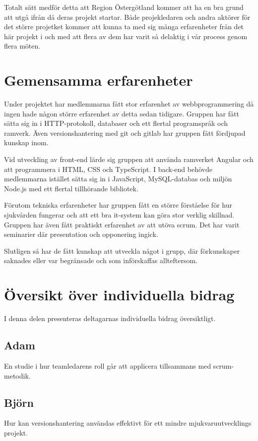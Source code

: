 Totalt sätt medför detta att Region Östergötland kommer att ha en bra grund att utgå ifrån då deras projekt startar. Både projekledaren och andra aktörer för det större projetket kommer att kunna ta med sig många erfarenheter från det här projekt i och med att flera av dem har varit så delaktig i vår process genom flera möten.

\section{Gemensamma erfarenheter}
Under projektet har medlemmarna fått stor erfarenhet av webbprogrammering då ingen hade någon större erfarenhet av detta sedan tidigare. Gruppen har fått sätta sig in i HTTP-protokoll, databaser och ett flertal programspråk och ramverk. Även versionshantering med git och gitlab har gruppen fått fördjupad kunskap inom. 

Vid utveckling av front-end lärde sig gruppen att använda ramverket Angular och att programmera i HTML, CSS och TypeScript. I back-end behövde medlemmarna istället sätta sig in i JavaScript, MySQL-databas och miljön Node.js med ett flertal tillhörande bibliotek.

Förutom tekniska erfarenheter har gruppen fått en större förståelse för hur sjukvården fungerar och att ett bra it-system kan göra stor verklig skillnad. Gruppen har även fått praktiskt erfarenhet av att utöva scrum. Det har varit seminarier där presentation och opponering ingick.  

Slutligen så har de fått kunskap att utveckla något i grupp, där förkunskaper saknades eller var begränsade och som införskaffas allteftersom.   

\section{Översikt över individuella bidrag}
I denna delen presenteras deltagarnas individuella bidrag översiktligt.

\subsection{Adam}
En studie i hur teamledarens roll går att applicera tillsammans med scrum-metodik.
\subsection{Björn}
Hur kan versionshantering användas effektivt för ett mindre mjukvaruutvecklings projekt.
